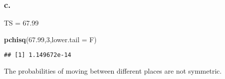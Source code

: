 \documentclass[]{article}
\newenvironment{Shaded}{\begin{snugshade}}{\end{snugshade}}
\newcommand{\KeywordTok}[1]{\textcolor[rgb]{0.13,0.29,0.53}{\textbf{#1}}}
\newcommand{\DataTypeTok}[1]{\textcolor[rgb]{0.13,0.29,0.53}{#1}}
\newcommand{\DecValTok}[1]{\textcolor[rgb]{0.00,0.00,0.81}{#1}}
\newcommand{\FloatTok}[1]{\textcolor[rgb]{0.00,0.00,0.81}{#1}}
\newcommand{\NormalTok}[1]{#1}
\begin{document}
\subsubsection{c.}\label{c.}

TS = 67.99

\begin{Shaded}
\begin{Highlighting}[]
\KeywordTok{pchisq}\NormalTok{(}\FloatTok{67.99}\NormalTok{,}\DecValTok{3}\NormalTok{,}\DataTypeTok{lower.tail =}\NormalTok{ F)}
\end{Highlighting}
\end{Shaded}

\begin{verbatim}
## [1] 1.149672e-14
\end{verbatim}

The probabilities of moving between different places are not symmetric.
\end{document}

